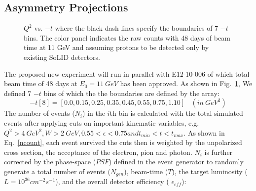 \subsection{Asymmetry Projections}
\begin{figure}[!ht]
 \begin{center}
   \caption[$Q^{2}$ vs. $-t$]{\footnotesize{$Q^{2}$ vs. $-t$ where the black dash lines specify the boundaries of 7 $-t$ bins. The color panel indicates the raw counts with 48 days of beam time at 11 GeV and assuming protons to be detected only by existing SoLID detectors. }}
  \label{Q2_t_bin}
  \end{center}
\end{figure}
The proposed new experiment will run in parallel with E12-10-006 of which total beam time of 48 days at $E_{0}=11~GeV$ has been approved.  As shown in Fig.~\ref{Q2_t_bin}, We defined 7 $-t$ bins of which the the boundaries are defined by the array:
 \begin{equation}
     -t[8] = [0.0, 0.15, 0.25, 0.35, 0.45, 0.55, 0.75, 1.10]~~~~(in~GeV^{2})
 \end{equation}
The number of events ($N_{i}$) in the $i$th bin is calculated with the total simulated events after applying cuts on important kinematic variables, e.g. $Q^{2}>4~GeV^{2}, W>2~GeV, 0.55<\epsilon<0.75 and t_{min}<t<t_{max}$. As shown in Eq.~\ref{ncount}, each event survived the cuts then is weighted by the unpolarized cross section, the acceptance of the electron, pion and photon. $N_{i}$ is further corrected by the phase-space ($PSF$) defined in the event generator to randomly generate a total number of events ($N_{gen}$), beam-time ($T$), the target luminosity ($L=10^{36} cm^{-2}s^{-1}$), and the overall detector efficiency ( $\epsilon_{eff}$):
